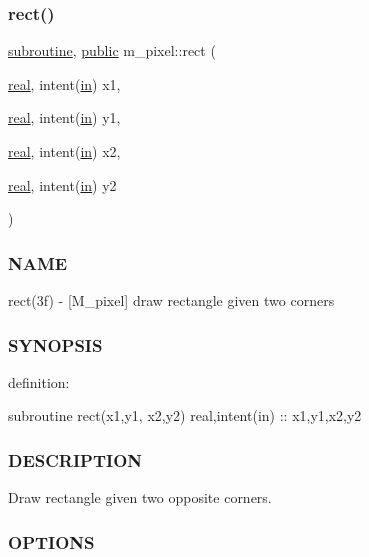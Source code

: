 \subsubsection{\texorpdfstring{rect()}{rect()}}
{\footnotesize\ttfamily \hyperlink{M__stopwatch_83_8txt_acfbcff50169d691ff02d4a123ed70482}{subroutine}, \hyperlink{M__stopwatch_83_8txt_a2f74811300c361e53b430611a7d1769f}{public} m\+\_\+pixel\+::rect (\begin{DoxyParamCaption}\item[{\hyperlink{read__watch_83_8txt_abdb62bde002f38ef75f810d3a905a823}{real}, intent(\hyperlink{M__journal_83_8txt_afce72651d1eed785a2132bee863b2f38}{in})}]{x1,  }\item[{\hyperlink{read__watch_83_8txt_abdb62bde002f38ef75f810d3a905a823}{real}, intent(\hyperlink{M__journal_83_8txt_afce72651d1eed785a2132bee863b2f38}{in})}]{y1,  }\item[{\hyperlink{read__watch_83_8txt_abdb62bde002f38ef75f810d3a905a823}{real}, intent(\hyperlink{M__journal_83_8txt_afce72651d1eed785a2132bee863b2f38}{in})}]{x2,  }\item[{\hyperlink{read__watch_83_8txt_abdb62bde002f38ef75f810d3a905a823}{real}, intent(\hyperlink{M__journal_83_8txt_afce72651d1eed785a2132bee863b2f38}{in})}]{y2 }\end{DoxyParamCaption})}



\subsubsection*{N\+A\+ME}

rect(3f) -\/ \mbox{[}M\+\_\+pixel\mbox{]} draw rectangle given two corners 

\subsubsection*{S\+Y\+N\+O\+P\+S\+IS}

definition\+:

subroutine rect(x1,y1, x2,y2) real,intent(in) \+:\+: x1,y1,x2,y2

\subsubsection*{D\+E\+S\+C\+R\+I\+P\+T\+I\+ON}

Draw rectangle given two opposite corners.

\subsubsection*{O\+P\+T\+I\+O\+NS}

